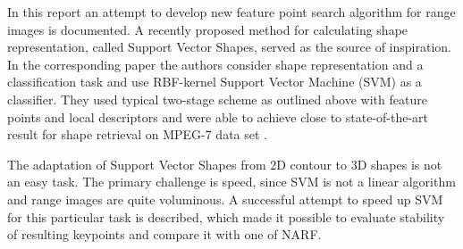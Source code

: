 In this report an attempt to develop new feature point search algorithm for range images is documented. A recently proposed method for calculating shape representation, called Support Vector Shapes, served as the source of inspiration. In the corresponding paper  \cite{SVS2013} the authors consider shape representation and a classification task and use RBF-kernel Support Vector Machine (SVM) \cite{cortes1995support} as a classifier. They used typical two-stage scheme as outlined above with feature points and local descriptors and were able to achieve close to state-of-the-art result for shape retrieval on MPEG-7 data set \cite{latecki2000shape}. 

The adaptation of Support Vector Shapes from 2D contour to 3D shapes is not an easy task. The primary challenge is speed, since   
SVM is not a linear algorithm and range images are quite voluminous. A successful attempt to speed up SVM for this particular  task is described, which made it possible to evaluate stability of resulting keypoints and compare it with one of NARF.
